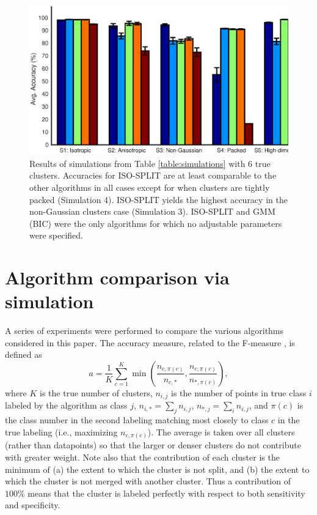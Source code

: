 \documentclass[10pt]{article}
\begin{document}
\begin{figure}
\begin{center}
\includegraphics[width=5.5in]{images/simulation_result_graph.eps}
\end{center}
\caption{
Results of simulations from Table \ref{table:simulations} with $6$ true clusters. Accuracies for ISO-SPLIT are at least comparable to the other algorithms in all cases except for when clusters are tightly packed (Simulation 4). ISO-SPLIT yields the highest accuracy in the non-Gaussian clusters case (Simulation 3). ISO-SPLIT and GMM (BIC) were the only algorithms for which no adjustable parameters were specified.
}
\label{fig:result_bars}
\end{figure}

\section {Algorithm comparison via simulation}
\label{algorithm_comparison}

A series of experiments were performed to compare the various algorithms considered in this paper. The accuracy measure, related to the F-measure \cite[Ch.~17]{zaki-book}, is defined as 
$$a=\frac{1}{K}\sum_{c=1}^K \min\left(\frac{n_{c,\pi(c)}}{n_{c,*}},\frac{n_{c,\pi(c)}}{n_{*,\pi(c)}}\right),$$
where $K$ is the true number of clusters, $n_{i,j}$ is the number of points in true class $i$ labeled by the algorithm as class $j$, $n_{i,*}=\sum_j n_{i,j}$, $n_{*,j}=\sum_i n_{i,j}$, and $\pi(c)$ is the class number in the second labeling matching most closely to class $c$ in the true labeling (i.e., maximizing $n_{c,\pi(c)}$).
The average is taken over all clusters (rather than datapoints) so that the larger or denser clusters do not contribute with greater weight. Note also that the contribution of each cluster is the minimum of (a) the extent to which the cluster is not split, and (b) the extent to which the cluster is not merged with another cluster. Thus a contribution of $100\%$ means that the cluster is labeled perfectly with respect to both sensitivity and specificity.
\end{document}
